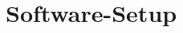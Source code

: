 \documentclass[root.tex]{subfiles}
\begin{document}
{\pagestyle{empty}}
\section{Software-Setup}
\label{chap:Software-Setup}
\end{document}
